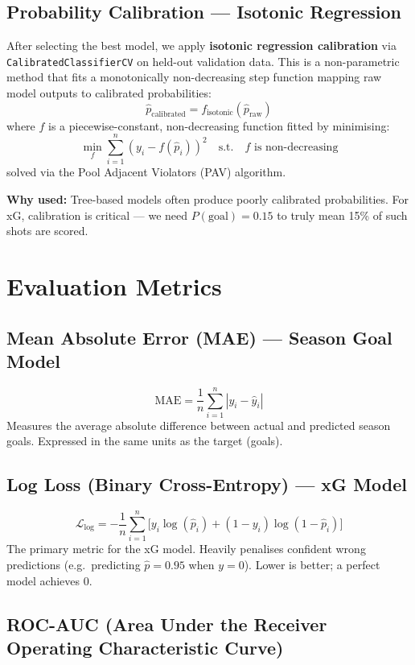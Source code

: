 \documentclass[11pt,a4paper]{article}
\begin{document}
\subsection{Probability Calibration --- Isotonic Regression}

After selecting the best model, we apply \textbf{isotonic regression
calibration} via \texttt{CalibratedClassifierCV} on held-out validation
data.  This is a non-parametric method that fits a monotonically
non-decreasing step function mapping raw model outputs to calibrated
probabilities:
\[
  \hat{p}_{\text{calibrated}} = f_{\text{isotonic}}(\hat{p}_{\text{raw}})
\]
where $f$ is a piecewise-constant, non-decreasing function fitted by
minimising:
\[
  \min_{f} \sum_{i=1}^{n} (y_i - f(\hat{p}_i))^2
  \quad\text{s.t.}\quad f \text{ is non-decreasing}
\]
solved via the Pool Adjacent Violators (PAV) algorithm.

\textbf{Why used:} Tree-based models often produce poorly calibrated
probabilities.  For xG, calibration is critical --- we need
$P(\text{goal}) = 0.15$ to truly mean 15\% of such shots are scored.


\section{Evaluation Metrics}

\subsection{Mean Absolute Error (MAE) --- Season Goal Model}
\[
  \mathrm{MAE} = \frac{1}{n}\sum_{i=1}^{n}|y_i - \hat{y}_i|
\]
Measures the average absolute difference between actual and predicted
season goals.  Expressed in the same units as the target (goals).

\subsection{Log Loss (Binary Cross-Entropy) --- xG Model}
\[
  \mathcal{L}_{\text{log}} = -\frac{1}{n}\sum_{i=1}^{n}
  \bigl[y_i\log(\hat{p}_i) + (1-y_i)\log(1-\hat{p}_i)\bigr]
\]
The primary metric for the xG model.  Heavily penalises confident wrong
predictions (e.g.\ predicting $\hat{p} = 0.95$ when $y = 0$).
Lower is better; a perfect model achieves 0.

\subsection{ROC-AUC (Area Under the Receiver Operating Characteristic Curve)}
\end{document}
